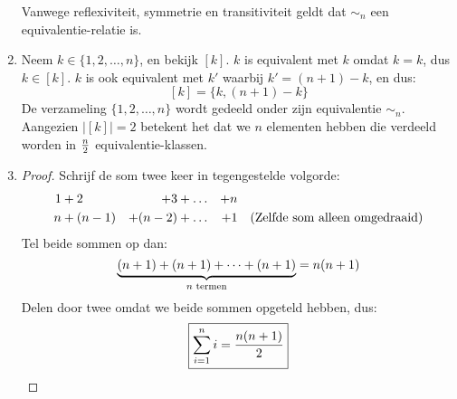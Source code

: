 \documentclass{article}
\begin{document}
\begin{enumerate}[label=\alph*)]
\begin{enumerate}[label=\arabic*.]
          \end{enumerate}
          Vanwege reflexiviteit, symmetrie en transitiviteit geldt dat $\sim_n$ een equivalentie-relatie is.
    \item
          Neem $k \in \{1, 2, \dots, n\}$, en bekijk $[k]$.
          $k$ is equivalent met $k$ omdat $k = k$, dus $k \in [k]$.
          $k$ is ook equivalent met $k'$ waarbij $k' = (n + 1) - k$, en dus:
          \[[k] = \{k, (n + 1) - k\}\]
          De verzameling $\{1, 2, \dots, n\}$ wordt gedeeld onder
          zijn equivalentie $\sim_n$. Aangezien
          $|[k]| = 2$ betekent het dat we $n$
          elementen hebben die verdeeld worden in $\frac{n}{2}$ equivalentie-klassen.


    \item
          \begin{proof}
              Schrijf de som twee keer in tegengestelde volgorde:
              \begin{align*}
                  1 & + 2     & + 3     & + \dots & + n &                                           \\
                  n & + (n-1) & + (n-2) & + \dots & + 1 & \quad (\text{Zelfde som alleen omgedraaid})
              \end{align*}
              Tel beide sommen op dan:
              \[\underbrace{(n+1) + (n+1) + \dots + (n+1)}_{n \text{ termen}} = n(n+1)\]
              Delen door twee omdat we beide sommen opgeteld hebben, dus:
              \[\boxed{\sum_{i=1}^{n} i = \frac{n(n+1)}{2}}\]
          \end{proof}
\end{enumerate}
\end{document}
